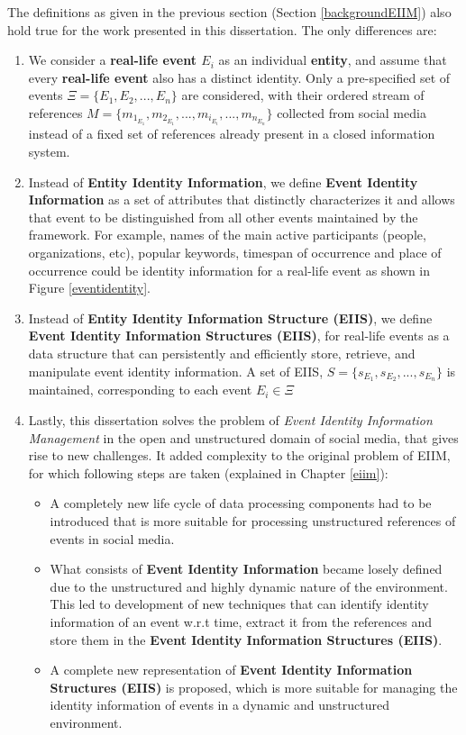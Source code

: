 The definitions as given in the previous section (Section \ref{backgroundEIIM}) also hold true for the work presented in this dissertation. The only differences are:
\begin{enumerate}
\item We consider a \textbf{real-life event $E_{i}$} as an individual \textbf{entity}, and assume that every \textbf{real-life event} also has a distinct identity. Only a pre-specified set of events $\Xi = \{E_{1},E_{2}, ... ,E_{n}\}$ are considered, with their ordered stream of references $M = \{m_{1_{E_{1}}}, m_{2_{E_{1}}}, ... ,m_{i_{E_{i}}}, ... ,m_{n_{E_{n}}}\}$ collected from social media instead of a fixed set of references already present in a closed information system.

\item Instead of \textbf{Entity Identity Information}, we define \textbf{Event Identity Information} as a set of attributes that distinctly characterizes it and allows that event to be distinguished from all other events maintained by the framework. For example, names of the main active participants (people, organizations, etc), popular keywords, timespan of occurrence and place of occurrence could be identity information for a real-life event as shown in Figure \ref{eventidentity}.

\item Instead of \textbf{Entity Identity Information Structure (EIIS)}, we define \textbf{Event Identity Information Structures (EIIS)}, for real-life events as a data structure that can persistently and efficiently store, retrieve, and manipulate event identity information. A set of EIIS, $S = \{s_{E_{1}},s_{E_{2}}, ... ,s_{E_{n}}\}$ is maintained, corresponding to each event $E_{i} \in \Xi$ 

\item Lastly, this dissertation solves the problem of \textit{Event Identity Information Management} in the open and unstructured domain of social media, that gives rise to new challenges. It added complexity to the original problem of EIIM, for which following steps are taken (explained in Chapter \ref{eiim}):

\begin{itemize}
\item A completely new life cycle of data processing components had to be introduced that is more suitable for processing unstructured references of events in social media.
\item What consists of \textbf{Event Identity Information} became losely defined due to the unstructured and highly dynamic nature of the environment. This led to development of new techniques that can identify identity information of an event w.r.t time, extract it from the references and store them in the \textbf{Event Identity Information Structures (EIIS)}.
\item A complete new representation of \textbf{Event Identity Information Structures (EIIS)} is proposed, which is more suitable for managing the identity information of events in a dynamic and unstructured environment.
\end{itemize}
\end{enumerate}


